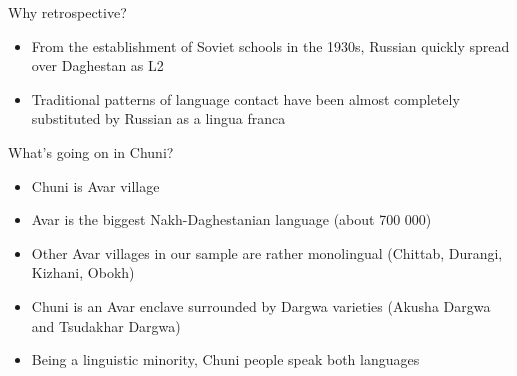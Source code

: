 \documentclass[13pt, t]{beamer}
\begin{document}
\begin{frame}{Why retrospective?}
\begin{itemize}
\item From the establishment of Soviet schools in the 1930s,  Russian quickly spread over Daghestan as L2
\item Traditional patterns of language contact have been almost completely substituted by Russian as a lingua franca
\end{itemize}
\end{frame}











\begin{frame}{What’s going on in Chuni?}
\begin{itemize}
\item Chuni is Avar village
\item Avar is the biggest Nakh-Daghestanian language (about 700 000)
\item Other Avar villages in our sample are rather monolingual (Chittab, Durangi, Kizhani, Obokh)
\item Chuni is an Avar enclave surrounded by Dargwa varieties (Akusha Dargwa and Tsudakhar Dargwa)
\item Being a linguistic minority, Chuni people speak both languages
\end{itemize}
\end{frame}
\end{document}
